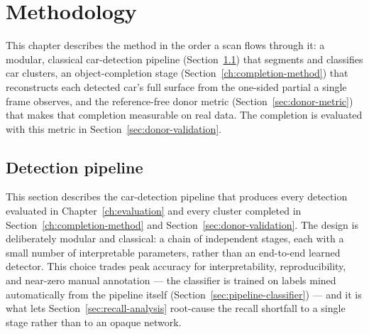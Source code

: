 %
%
\chapter{Methodology}
\label{ch:pipeline}

This chapter describes the method in the order a scan flows through it: a modular,
classical car-detection pipeline (Section~\ref{sec:meth-detection}) that segments
and classifies car clusters, an object-completion stage
(Section~\ref{ch:completion-method}) that reconstructs each detected car's full
surface from the one-sided partial a single frame observes, and the reference-free
donor metric (Section~\ref{sec:donor-metric}) that makes that completion measurable
on real data. The completion is evaluated with this metric in
Section~\ref{sec:donor-validation}.

\section{Detection pipeline}
\label{sec:meth-detection}

This section describes the car-detection pipeline that produces every detection
evaluated in Chapter~\ref{ch:evaluation} and every cluster completed in
Section~\ref{ch:completion-method} and Section~\ref{sec:donor-validation}. The
design is deliberately modular and classical: a chain of independent stages,
each with a small number of interpretable parameters, rather than an end-to-end
learned detector. This choice trades peak accuracy for interpretability,
reproducibility, and near-zero manual annotation --- the classifier is trained on
labels mined automatically from the pipeline itself
(Section~\ref{sec:pipeline-classifier}) --- and it is what lets Section~\ref{sec:recall-analysis}
root-cause the recall shortfall to a single stage rather than to an opaque
network.


